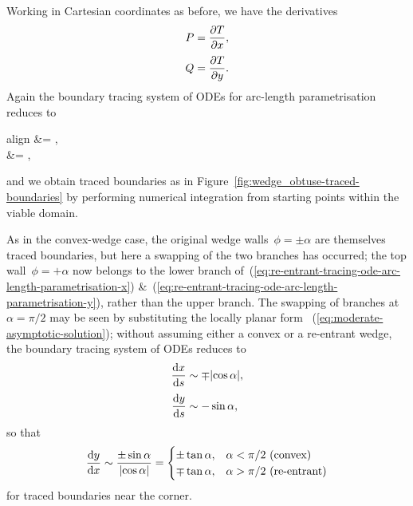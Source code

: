\begin{figure}
\end{figure}

Working in Cartesian coordinates as before,
we have the derivatives
\begin{align}
  P &= \pder{T}{x},
    \label{eq:re-entrant-gradient-x-component} \\[\tallspace]
  Q &= \pder{T}{y}.
    \label{eq:re-entrant-gradient-y-component}
\end{align}
Again the boundary tracing system of ODEs for arc-length parametrisation
reduces to
\begin{important}{align}
   &= ,
    \label{eq:re-entrant-tracing-ode-arc-length-parametrisation-x}
    \\[\tallspace]
   &= ,
    \label{eq:re-entrant-tracing-ode-arc-length-parametrisation-y}
\end{important}
and we obtain traced boundaries
as in Figure~\ref{fig:wedge_obtuse-traced-boundaries}
by performing numerical integration
from starting points within the viable domain.

As in the convex-wedge case,
the original wedge walls~$\phi = \pm\alpha$
are themselves traced boundaries,
but here a swapping of the two branches has occurred;
the top wall~$\phi = +\alpha$ now belongs to the lower branch
of~(\ref{eq:re-entrant-tracing-ode-arc-length-parametrisation-x})
\&~(\ref{eq:re-entrant-tracing-ode-arc-length-parametrisation-y}),
rather than the upper branch.
The swapping of branches at~$\alpha = \pi/2$ may be seen
by substituting the locally planar form~%
  (\ref{eq:moderate-asymptotic-solution});
without assuming either a convex or a re-entrant wedge,
the boundary tracing system of ODEs reduces to
\begin{align}
  \tder{x}{s} &\asy \mp \abs{\cos\alpha},
    \label{eq:planar-asymptotic-tracing-ode-arc-length-parametrisation-x}
    \\[\tallspace]
  \tder{y}{s} &\asy -\sin\alpha,
    \label{eq:planar-asymptotic-tracing-ode-arc-length-parametrisation-y}
\end{align}
so that
\begin{equation}
  \tder{y}{x} \asy \frac{\pm\sin\alpha}{\abs{\cos\alpha}} =
    \begin{cases}
      \pm\tan\alpha, &\text{$\alpha < \pi/2$ (convex)} \\
      \mp\tan\alpha, &\text{$\alpha > \pi/2$ (re-entrant)}
    \end{cases}
  \label{eq:planar-asymptotic-tracing-ode-coordinate-parametrisation-y}
\end{equation}
for traced boundaries near the corner.

